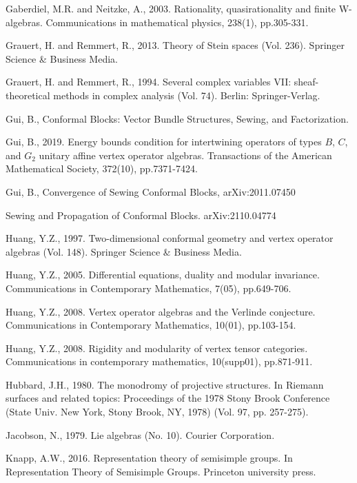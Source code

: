 \documentclass[12pt,a4paper,notitlepage]{article}
\theoremstyle{definition}
\theoremstyle{plain}
\numberwithin{equation}{section}
\begin{document}
\begin{thebibliography}{999999}
Gaberdiel, M.R. and Neitzke, A., 2003. Rationality, quasirationality and finite W-algebras. Communications in mathematical physics, 238(1), pp.305-331.



Grauert, H. and Remmert, R., 2013. Theory of Stein spaces (Vol. 236). Springer Science \& Business Media.

Grauert, H. and Remmert, R., 1994. Several complex variables VII: sheaf-theoretical methods in complex analysis (Vol. 74). Berlin: Springer-Verlag.

Gui, B., Conformal Blocks: Vector Bundle Structures, Sewing, and Factorization.

Gui, B., 2019. Energy bounds condition for intertwining operators of types $B$, $C$, and $G_2$ unitary affine vertex operator algebras. Transactions of the American Mathematical Society, 372(10), pp.7371-7424.

Gui, B., Convergence of Sewing Conformal Blocks,  arXiv:2011.07450

Sewing and Propagation of Conformal Blocks. arXiv:2110.04774

Huang, Y.Z., 1997. Two-dimensional conformal geometry and vertex operator algebras (Vol. 148). Springer Science \& Business Media.

Huang, Y.Z., 2005. Differential equations, duality and modular invariance. Communications in Contemporary Mathematics, 7(05), pp.649-706.
	
Huang, Y.Z., 2008. Vertex operator algebras and the Verlinde conjecture. Communications in Contemporary Mathematics, 10(01), pp.103-154.
	
	
Huang, Y.Z., 2008. Rigidity and modularity of vertex tensor categories. Communications in contemporary mathematics, 10(supp01), pp.871-911.

Hubbard, J.H., 1980. The monodromy of projective structures. In Riemann surfaces and related topics: Proceedings of the 1978 Stony Brook Conference (State Univ. New York, Stony Brook, NY, 1978) (Vol. 97, pp. 257-275).

Jacobson, N., 1979. Lie algebras (No. 10). Courier Corporation.


Knapp, A.W., 2016. Representation theory of semisimple groups. In Representation Theory of Semisimple Groups. Princeton university press.




\end{thebibliography}
\end{document}
